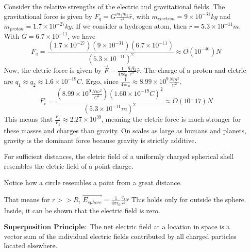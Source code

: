 \documentclass[nobib]{tufte-handout}
\newcommand{\defn}[2]{\noindent\textbf{#1}:\ #2}
\begin{document}
Consider the relative strengths of the electric and 
gravitational fields. The gravitational force is given by
$F_g = G\frac{m_1m_2}{r^2}\hat{r}$, with $m_{electron} = 9 \times 10^{-31} kg$
and $m_{proton} = 1.7 \times 10^{-27} kg$. If we consider a hydrogen atom,  
then $r = 5.3 \times 10^{-11} m$. With $G = 6.7 \times 10^{-11}$, we have 
\[F_g = \frac{(1.7 \times 10^{-27})(9 \times 10^{-31})(6.7 \times 10^{-11})}{(5.3 \times 10^{-11})^2} \approx O(10^{-46})N\]
Now, the eletric force is given by $\vec{F} = \frac{1}{4\pi \epsilon_0}\frac{q_1 q_2}{r^2}\hat{r}$. 
The charge of a proton and eletric are $q_1 \approx q_2 \approx 1.6 \times 10^{-19} C$.
Ergo, since $\frac{1}{4\pi \epsilon_0} \approx 8.99 \times 10^9 \frac{Nm^2}{C^2}$, 
\[F_e = \frac{(8.99 \times 10^9 \frac{Nm^2}{C^2})(1.60\times10^{-19}C)^2}{(5.3\times10^{-11}m)^2} \approx O(10^-17)N\]
This means that $\frac{F_e}{F_g}\approx 2.27 \times 10^{39}$, meaning the eletric force is
much stronger for these masses and charges than gravity. On scales as large as humans and planets,
gravity is the dominant force because gravity is strictly additive.

For sufficient distances, the eletric field
of a uniformly charged spherical shell resembles
the eletric field of a point charge. 

\begin{marginfigure}
    \begin{center}
    \end{center}

    \caption{Notice how a circle resembles a point from a great distance.}
    \label{fig:long-distance-point-sphere}
\end{marginfigure}

That means for $r>>R$, $\vec{E_{sphere}} = \frac{1}{4\pi \epsilon_0}\frac{q_1}{r^2}\hat{r}$
This holds only for outside the sphere. Inside, it can be shown that the electric field is zero. 

\defn{Superposition Principle}{The net electric field at a location in space is a
vector sum of the individual electric fields contributed by all
charged particles located elsewhere.}
\end{document}
